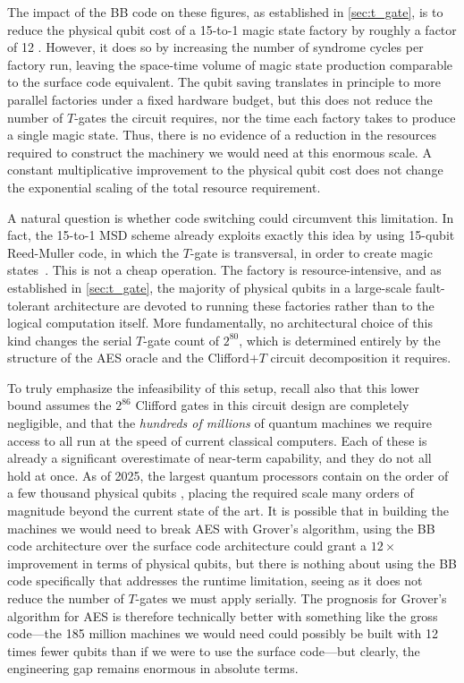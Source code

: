 The impact of the BB code on these figures, as established in \cref{sec:t_gate}, is to reduce the physical qubit
cost of a 15-to-1 magic state factory by roughly a factor of 12
\cite{Xu_2026}. However, it does so by increasing the number of syndrome cycles per factory run, leaving the space-time volume of magic state production comparable to the surface code equivalent. The qubit saving translates in principle to more parallel factories under a fixed hardware budget, but this does not reduce the number of $T$-gates the circuit requires, nor the time each factory takes to produce a single magic state. Thus, there is no evidence of a reduction in the resources required to construct the machinery we would need at this enormous scale. A constant multiplicative improvement to the physical qubit cost does not change the exponential scaling of the total resource requirement.

A natural question is whether code switching could circumvent this limitation. 
In fact, the 15-to-1 MSD scheme already exploits exactly this idea by using 15-qubit Reed-Muller code, in which the $T$-gate is transversal, in order to create magic states~\cite{Bravyi_2005}. This is not a cheap operation. The factory is resource-intensive, and as established in \cref{sec:t_gate}, the majority of physical qubits in a large-scale fault-tolerant architecture are devoted to running these factories rather than to the logical computation itself. More fundamentally, no architectural choice of this kind changes the serial $T$-gate count of $2^{80}$, which is determined entirely by the structure of the AES oracle and the Clifford$+T$ circuit decomposition it requires.

To truly emphasize the infeasibility of this setup, recall also that this lower bound assumes the $2^{86}$ Clifford gates in this circuit design are completely negligible, and that the \emph{hundreds of millions} of quantum machines we require access to all run at the speed of current classical computers. Each of these is already a significant overestimate of near-term capability, and they do not all hold at once. 
As of 2025, the largest quantum processors contain on the order of a few thousand physical qubits \cite{Manetsch_2025}, placing the required scale many orders of magnitude beyond the current state of the art. It is possible that in building the machines we would need to break AES with Grover's algorithm, using the BB code architecture over the surface code architecture could grant a $12\times$ improvement in terms of physical qubits, but there is nothing about using the BB code specifically that addresses the runtime limitation, seeing as it does not reduce the number of $T$-gates we must apply serially.
The prognosis for Grover's algorithm for AES is therefore technically better with something like the gross code---the 185 million machines we would need could possibly be built with 12 times fewer qubits than if we were to use the surface code---but clearly, the engineering gap remains enormous in absolute terms.

